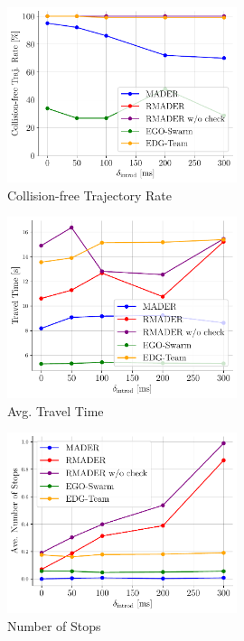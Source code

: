 \begin{figure}
    \centering
    \includegraphics[width=0.6\textwidth]{figures/collision_free_traj.pdf}
    \caption{\centering Collision-free Trajectory Rate}
    \label{fig:sim_collision_free_traj_rate}
\end{figure}

\begin{figure}
    \centering
    \includegraphics[width=0.6\textwidth]{figures/travel_time.pdf}
    \caption{\centering Avg. Travel Time}
    \label{fig:sim_travel_time}
\end{figure}

\begin{figure}
    \centering
    \includegraphics[width=0.6\textwidth]{figures/stop.pdf}
    \caption{\centering Number of Stops}
    \label{fig:sim_stop}
\end{figure}

